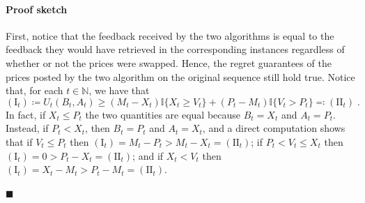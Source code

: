 \documentclass[final,12pt]{colt2025}
\newenvironment{proofsketch}{\paragraph{Proof sketch}}{\hfill$\blacksquare$}
\newcommand{\I}{\mathbb{I}}
\newcommand{\N}{\mathbb{N}}
\newcommand{\nP}{M}
\newcommand{\nZ}{V}
\newcommand{\nB}{B}
\newcommand{\nS}{A}
\newcommand{\nX}{X}
\newcommand{\nY}{P}
\begin{document}
\begin{proofsketch}%
     First, notice that the feedback received by the two algorithms is equal to the feedback they would have retrieved in the corresponding instances regardless of whether or not the prices were swapped. 
     Hence, the regret guarantees of the prices posted by the two algorithm on the original sequence still hold true.
     Notice that, for each $t \in \N$, we have that
     \[
        (\textrm{I}_t) \coloneqq U_t(\nB_t,\nS_t)
    \ge
        (\nP_t - \nX_t) \I\{\nX_t \ge \nZ_t \} + (\nY_t - \nP_t) \I\{\nZ_t > \nY_t \} \eqqcolon (\textrm{II}_t)\;.
     \]
    In fact, if $\nX_t \le \nY_t$ the two quantities are equal because $\nB_t = \nX_t$ and $\nS_t = \nY_t$.
    Instead, if $\nY_t < \nX_t$, then $\nB_t = \nY_t$ and $\nS_t = \nX_t$, and a direct computation shows that if $\nZ_t \le \nY_t$ then
            $
                (\textrm{I}_t) 
                 =
                \nP_t - \nY_t
                >
                \nP_t - \nX_t
                =
                (\textrm{II}_t)
            $;
        if $\nY_t < \nZ_t \le \nX_t$ then
            $
                (\textrm{I}_t) 
                 =
                0
                >
                \nY_t - \nX_t
                =
                (\textrm{II}_t)
            $;
        and if $\nX_t < \nZ_t$ then
            $
                (\textrm{I}_t) 
                =
                \nX_t - \nP_t
                >
                \nY_t - \nP_t
                =
                (\textrm{II}_t)
            $.

\end{proofsketch}
\end{document}
